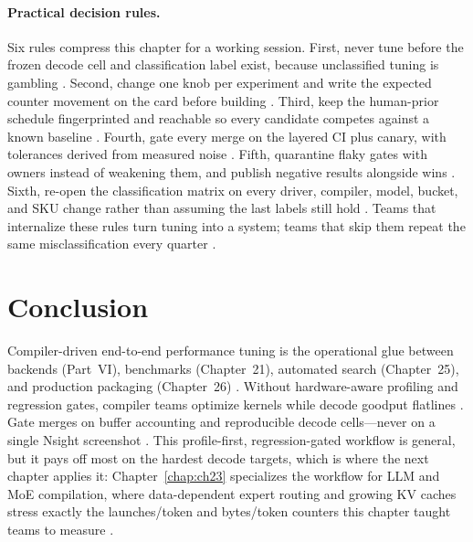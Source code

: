 \paragraph{Practical decision rules.}
Six rules compress this chapter for a working session. First, never tune before the frozen decode cell and classification label exist, because unclassified tuning is gambling \citep{patel2025llminference,memoryfloor2026}. Second, change one knob per experiment and write the expected counter movement on the card before building \citep{chen2020compilerbasedhardw,taxbreak2026}. Third, keep the human-prior schedule fingerprinted and reachable so every candidate competes against a known baseline \citep{memoryfloor2026,patel2025llminference}. Fourth, gate every merge on the layered CI plus canary, with tolerances derived from measured noise \citep{chen2020compilerbasedhardw,memoryfloor2026}. Fifth, quarantine flaky gates with owners instead of weakening them, and publish negative results alongside wins \citep{patel2025llminference,taxbreak2026}. Sixth, re-open the classification matrix on every driver, compiler, model, bucket, and SKU change rather than assuming the last labels still hold \citep{memoryfloor2026,patel2025llminference}. Teams that internalize these rules turn tuning into a system; teams that skip them repeat the same misclassification every quarter \citep{taxbreak2026,memoryfloor2026}.

\section{Conclusion}
\label{sec:ch22_conclusion}

Compiler-driven end-to-end performance tuning is the operational glue between backends (Part~VI), benchmarks (Chapter~21), automated search (Chapter~25), and production packaging (Chapter~26) \citep{chen2020compilerbasedhardw,yirage2026,patel2025llminference,memoryfloor2026,taxbreak2026,kwon2023vllm,liu2024deepseekv3,amd2024aie,dlbook,semianalysis2024tma,amd2024xdna,dao2022flashattention,dao2023flashdecoding,nvidia2024cudagraphs,nvidia2022hopper}. Without hardware-aware profiling and regression gates, compiler teams optimize kernels while decode goodput flatlines \citep{taxbreak2026,memoryfloor2026,patel2025llminference,yirage2026,chen2020compilerbasedhardw,amd2024aie,dlbook,kwon2023vllm,liu2024deepseekv3,semianalysis2024tma,amd2024xdna,dao2022flashattention,dao2023flashdecoding,nvidia2024cudagraphs,nvidia2022hopper}. Gate merges on buffer accounting and reproducible decode cells---never on a single Nsight screenshot \citep{semianalysis2024tma,yirage2026,patel2025llminference,memoryfloor2026,taxbreak2026}. This profile-first, regression-gated workflow is general, but it pays off most on the hardest decode targets, which is where the next chapter applies it: Chapter~\ref{chap:ch23} specializes the workflow for LLM and MoE compilation, where data-dependent expert routing and growing KV caches stress exactly the launches/token and bytes/token counters this chapter taught teams to measure \citep{liu2024deepseekv3,kwon2023vllm}.

